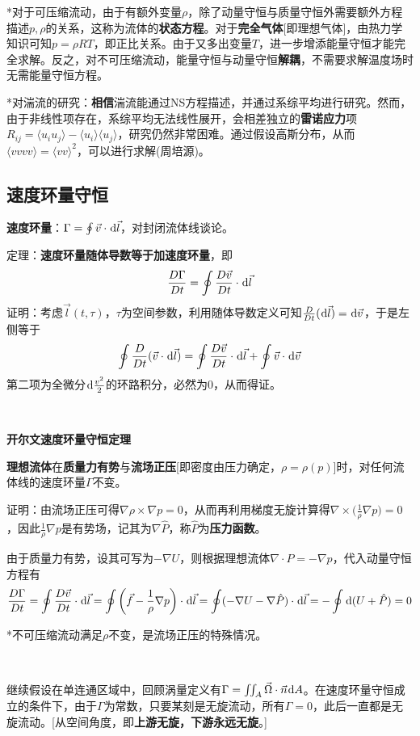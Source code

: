 \documentclass[a4paper,UTF8,fontset=windows]{ctexart}
\newcommand*{\dr}{\hspace{0.07em}\mathrm{d}}
\begin{document}
*对于可压缩流动，由于有额外变量$\rho$，除了动量守恒与质量守恒外需要额外方程描述$p,\rho$的关系，这称为流体的\textbf{状态方程}。对于\textbf{完全气体}[即理想气体]，由热力学知识可知$p=\rho RT$，即正比关系。由于又多出变量$T$，进一步增添能量守恒才能完全求解。反之，对不可压缩流动，能量守恒与动量守恒\textbf{解耦}，不需要求解温度场时无需能量守恒方程。

*对湍流的研究：\textbf{相信}湍流能通过NS方程描述，并通过系综平均进行研究。然而，由于非线性项存在，系综平均无法线性展开，会相差独立的\textbf{雷诺应力}项$R_{ij}=\langle u_iu_j\rangle-\langle u_i\rangle\langle u_j\rangle$，研究仍然非常困难。通过假设高斯分布，从而$\langle vvvv\rangle=\langle vv\rangle^2$，可以进行求解(周培源)。

\subsection{速度环量守恒}
\textbf{速度环量}：$\Gamma=\oint\vec{v}\cdot\dr\vec{l}$，对封闭流体线谈论。

定理：\textbf{速度环量随体导数等于加速度环量}，即
$$\frac{D\Gamma}{Dt}=\oint\frac{D\vec{v}}{Dt}\cdot\dr\vec{l}$$
证明：考虑$\vec{l}(t,\tau)$，$\tau$为空间参数，利用随体导数定义可知$\frac{D}{Dt}(\dr\vec{l})=\dr\vec{v}$，于是左侧等于
$$\oint\frac{D}{Dt}(\vec{v}\cdot\dr\vec{l})=\oint\frac{D\vec{v}}{Dt}\cdot\dr\vec{l}+\oint\vec{v}\cdot\dr\vec{v}$$
第二项为全微分$\dr\frac{v^2}{2}$的环路积分，必然为0，从而得证。

\

\textbf{开尔文速度环量守恒定理}

\textbf{理想流体}在\textbf{质量力有势}与\textbf{流场正压}[即密度由压力确定，$\rho=\rho(p)$]时，对任何流体线的速度环量$\Gamma$不变。

证明：由流场正压可得$\nabla\rho\times\nabla p=0$，从而再利用梯度无旋计算得$\nabla\times\big(\frac{1}{\rho}\nabla p\big)=0$，因此$\frac{1}{\rho}\nabla p$是有势场，记其为$\nabla\hat{P}$，称$\hat{P}$为\textbf{压力函数}。

由于质量力有势，设其可写为$-\nabla U$，则根据理想流体$\nabla\cdot P=-\nabla p$，代入动量守恒方程有
$$\frac{D\Gamma}{Dt}=\oint\frac{D\vec{v}}{Dt}\cdot\dr\vec{l}=\oint\bigg(\vec{f}-\frac{1}{\rho}\nabla p\bigg)\cdot\dr\vec{l}=\oint(-\nabla U-\nabla\hat{P})\cdot\dr\vec{l}=-\oint\dr(U+\hat{P})=0$$

*不可压缩流动满足$\rho$不变，是流场正压的特殊情况。

\

继续假设在单连通区域中，回顾涡量定义有$\Gamma=\iint_A\vec{\Omega}\cdot\vec{n}\dr A$。在速度环量守恒成立的条件下，由于$\Gamma$为常数，只要某刻是无旋流动，所有$\Gamma=0$，此后一直都是无旋流动。[从空间角度，即\textbf{上游无旋，下游永远无旋}。]
\end{document}
